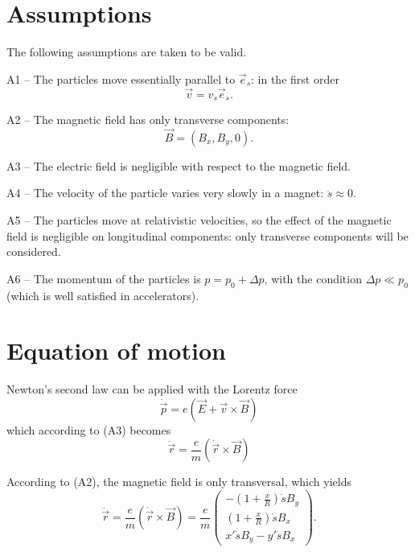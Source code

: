 \section{Assumptions}
The following assumptions are taken to be valid.
\begin{description}
    \item{A1 --} The particles move essentially parallel to $\vec{e}_s$: in the first order
    \begin{equation*}
        \vec{v} = v_s \vec{e}_s.
    \end{equation*}
    \item{A2 --} The magnetic field has only transverse components:
        \begin{equation*}
        \vec{B} = (B_x, B_y, 0).
        \end{equation*}
    \item{A3 --} The electric field is negligible with respect to the magnetic field.
    \item{A4 --} The velocity of the particle varies very slowly in a magnet: $\ddot{s} \approx 0$.
    \item{A5 --} The particles move at relativistic velocities, so the effect of the magnetic field is negligible on longitudinal components: only transverse components will be considered.
    \item{A6 --} The momentum of the particles is $p = p_0+\Delta p$, with the condition $\Delta p \ll p_0$ (which is well satisfied in accelerators).
\end{description}

\section{Equation of motion}
\label{sec:eq_motion}
Newton's second law can be applied with the Lorentz force
\begin{equation}
\dot{\vec{p}} = e(\vec{E}+\vec{v} \times \vec{B})
\end{equation}
which according to (A3) becomes
\begin{equation}
\ddot{\vec{r}} = \frac{e}{m}(\dot{\vec{r}} \times \vec{B})
\end{equation}

According to (A2), the magnetic field is only transversal, which yields
\begin{equation}
\label{eq:lorentz_transv}
\ddot{\vec{r}} = \frac{e}{m}(\dot{\vec{r}} \times \vec{B})
= \frac{e}{m}
    \begin{pmatrix}
        -\left(1+\frac{x}{R}\right)\dot{s}B_y \\
        \left(1+\frac{x}{R}\right)\dot{s}B_x \\
        x'\dot{s}B_y - y'\dot{s}B_x
    \end{pmatrix}.
\end{equation}

